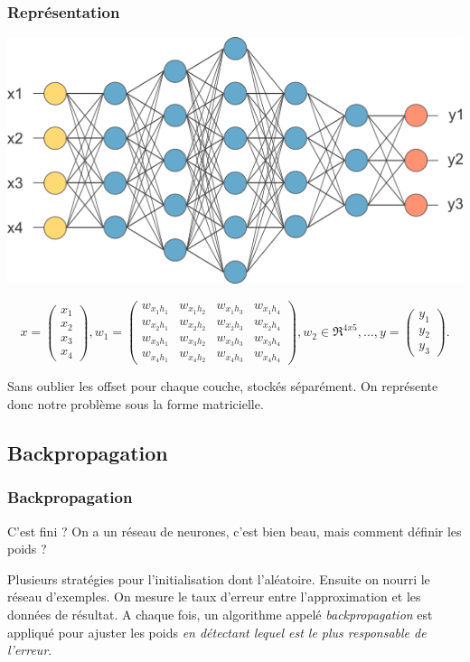 \documentclass[compress]{beamer}
\begin{document}
			\begin{frame}
				\frametitle{Représentation}
				\vspace{-2em}
				\centerline{\includegraphics[width=0.3\linewidth]{img/deep_neural_network}}
				\vspace{-1em}
				\[
					x = 
					\begin{pmatrix}
					x_1\\x_2\\x_3\\x_4
					\end{pmatrix}
					,
					w_1 = \begin{pmatrix}
					w_{{x_1}{h_1}} & w_{{x_1}{h_2}} & w_{{x_1}{h_3}} & w_{{x_1}{h_4}} \\
					w_{{x_2}{h_1}} & w_{{x_2}{h_2}} & w_{{x_2}{h_3}} & w_{{x_2}{h_4}} \\
					w_{{x_3}{h_1}} & w_{{x_3}{h_2}} & w_{{x_3}{h_3}} & w_{{x_3}{h_4}} \\
					w_{{x_4}{h_1}} & w_{{x_4}{h_2}} & w_{{x_4}{h_3}} & w_{{x_4}{h_4}}
					\end{pmatrix}				
					,
					w_2 \in \Re^{4x5}
					, ... ,
					y = 
					\begin{pmatrix}
					y_1\\y_2\\y_3
					\end{pmatrix}
					.
				\]			
								
				Sans oublier les offset pour chaque couche, stockés séparément. On représente donc notre problème sous la forme matricielle.
								
				\end{frame}

			\subsection{Backpropagation}
			\begin{frame}
				\frametitle{Backpropagation}
				\begin{alertblock}{C'est fini ?}
					On a un réseau de neurones, c'est bien beau, mais comment définir les poids ?
				\end{alertblock}
				
				Plusieurs stratégies pour l'initialisation dont l'aléatoire.
				Ensuite on nourri le réseau d'exemples. On mesure le taux d'erreur entre l'approximation et les données de résultat. A chaque fois, un algorithme appelé \emph{backpropagation} est appliqué pour ajuster les poids \emph{en détectant lequel est le plus responsable de l'erreur}.
			\end{frame}
			
\end{document}
